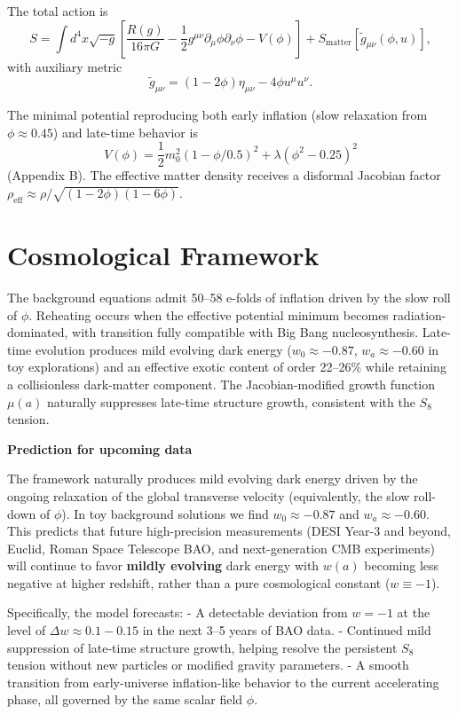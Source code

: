 \documentclass[11pt,a4paper]{article}
\begin{document}
The total action is
\[
S = \int d^4x\sqrt{-g}\left[\frac{R(g)}{16\pi G} - \frac{1}{2}g^{\mu\nu}\partial_\mu\phi\partial_\nu\phi - V(\phi)\right] + S_\text{matter}[\tilde{g}_{\mu\nu}(\phi,u)],
\]
with auxiliary metric
\[
\tilde{g}_{\mu\nu} = (1-2\phi)\eta_{\mu\nu} - 4\phi u^\mu u^\nu.
\]

The minimal potential reproducing both early inflation (slow relaxation from $\phi \approx 0.45$) and late-time behavior is
\[
V(\phi) = \frac{1}{2}m_0^2(1 - \phi/0.5)^2 + \lambda(\phi^2 - 0.25)^2
\]
(Appendix B). The effective matter density receives a disformal Jacobian factor $\rho_\text{eff} \approx \rho / \sqrt{(1-2\phi)(1-6\phi)}$.

\section{Cosmological Framework}
The background equations admit 50--58 e-folds of inflation driven by the slow roll of $\phi$. Reheating occurs when the effective potential minimum becomes radiation-dominated, with transition fully compatible with Big Bang nucleosynthesis. Late-time evolution produces mild evolving dark energy ($w_0 \approx -0.87$, $w_a \approx -0.60$ in toy explorations) and an effective exotic content of order 22--26\% while retaining a collisionless dark-matter component. The Jacobian-modified growth function $\mu(a)$ naturally suppresses late-time structure growth, consistent with the $S_8$ tension.

\textbf{Prediction for upcoming data}

The framework naturally produces mild evolving dark energy driven by the ongoing relaxation of the global transverse velocity (equivalently, the slow roll-down of $\phi$). In toy background solutions we find $w_0 \approx -0.87$ and $w_a \approx -0.60$. This predicts that future high-precision measurements (DESI Year-3 and beyond, Euclid, Roman Space Telescope BAO, and next-generation CMB experiments) will continue to favor \textbf{mildly evolving} dark energy with $w(a)$ becoming less negative at higher redshift, rather than a pure cosmological constant ($w \equiv -1$).

Specifically, the model forecasts:  
- A detectable deviation from $w = -1$ at the level of $\Delta w \approx 0.1-0.15$ in the next 3--5 years of BAO data.  
- Continued mild suppression of late-time structure growth, helping resolve the persistent $S_8$ tension without new particles or modified gravity parameters.  
- A smooth transition from early-universe inflation-like behavior to the current accelerating phase, all governed by the same scalar field $\phi$.
\end{document}
